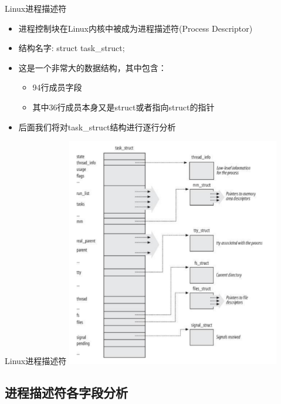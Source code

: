 \documentclass[xcolor=svgnames]{beamer}
\begin{document}
\begin{CJK*}{UTF8}{gbsn}
\begin{frame}{Linux进程描述符}
\begin{itemize}
\item 进程控制块在Linux内核中被成为进程描述符(Process Descriptor)
\item 结构名字: struct task\_struct;
\item 这是一个非常大的数据结构，其中包含：
\begin{itemize}
\item 94行成员字段
\item 其中36行成员本身又是struct或者指向struct的指针
\end{itemize}
\item 后面我们将对task\_struct结构进行逐行分析
\end{itemize}
\end{frame}

\begin{frame}{Linux进程描述符}
\includegraphics[width=0.7\textwidth]{taskstruct.png}
\end{frame}

\subsection{进程描述符各字段分析}


\end{CJK*}
\end{document}
